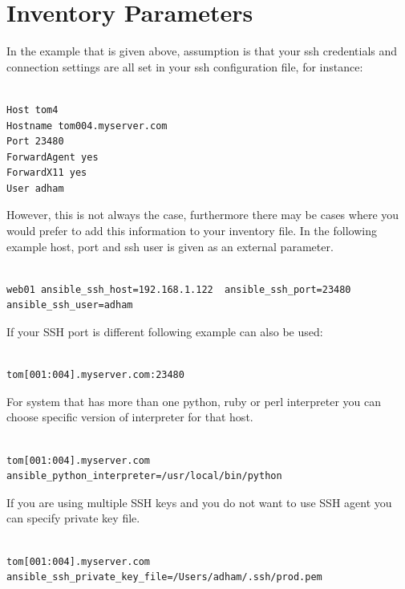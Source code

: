 \documentclass[10pt]{book}
\begin{document}
\section{Inventory Parameters}
In the example that is given above, assumption is that your ssh credentials and 
connection settings are all set in your ssh configuration file, for instance:

\begin{Verbatim}

Host tom4
Hostname tom004.myserver.com
Port 23480
ForwardAgent yes
ForwardX11 yes
User adham

\end{Verbatim}

However, this is not always the case, furthermore there may be cases where you 
would prefer to add this information to your inventory file. In the 
following example host, port and ssh user is given as an external parameter.

\begin{Verbatim}

web01 ansible_ssh_host=192.168.1.122  ansible_ssh_port=23480 ansible_ssh_user=adham

\end{Verbatim}

If your SSH port is different following example can also be used:

\begin{Verbatim}
  
tom[001:004].myserver.com:23480

\end{Verbatim}


For system that has more than one python, ruby or perl interpreter you can choose specific 
version of interpreter for that host.

\begin{Verbatim}

tom[001:004].myserver.com  ansible_python_interpreter=/usr/local/bin/python

\end{Verbatim}


If you are using multiple SSH keys and you do not want to use SSH agent you can 
specify private key file.


\begin{Verbatim}

tom[001:004].myserver.com  ansible_ssh_private_key_file=/Users/adham/.ssh/prod.pem

\end{Verbatim}
\end{document}
